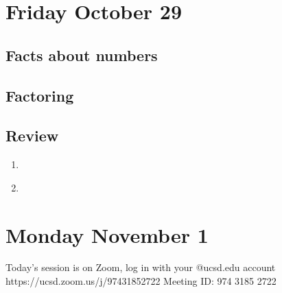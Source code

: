 \documentclass[12pt, oneside]{article}
\begin{document}
\newpage
\section*{Friday October 29}
\subsection*{Facts about numbers}

\subsection*{Factoring}



\newpage




\newpage
\subsection*{Review}
\begin{enumerate}
    \item \hspace{1in}\\ 
    \item \hspace{1in}\\ 
\end{enumerate}


\section*{Monday November 1}

Today's session is on Zoom, log in with your @ucsd.edu account https://ucsd.zoom.us/j/97431852722
Meeting ID: 974 3185 2722


\end{document}
